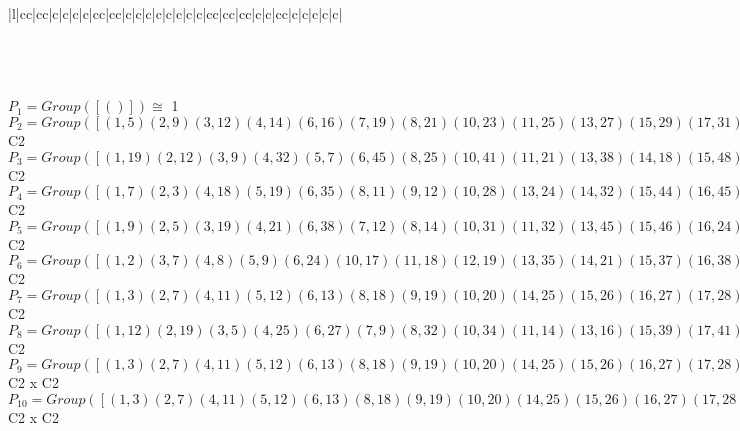 \documentclass[varwidth=\maxdimen,border=10]{standalone}
\begin{document}
\begin{tabular}
\begin{array}{|l|cc|cc|c|c|c|c|cc|cc|c|c|c|c|c|c|c|c|cc|cc|cc|c|c|cc|c|c|c|c|c|}
\end{array}\)\\
\ \\
\ \\
$P_{1} = Group( [ () ] )\cong$ 1\ \\
$P_{2} = Group( [ ( 1, 5)( 2, 9)( 3,12)( 4,14)( 6,16)( 7,19)( 8,21)(10,23)(11,25)(13,27)(15,29)(17,31)(18,32)(20,34)(22,36)(24,38)(26,39)(28,41)(30,42)(33,43)(35,45)(37,46)(40,47)(44,48) ] )\cong$ C2\ \\
$P_{3} = Group( [ ( 1,19)( 2,12)( 3, 9)( 4,32)( 5, 7)( 6,45)( 8,25)(10,41)(11,21)(13,38)(14,18)(15,48)(16,35)(17,34)(20,31)(22,47)(23,28)(24,27)(26,46)(29,44)(30,43)(33,42)(36,40)(37,39) ] )\cong$ C2\ \\
$P_{4} = Group( [ ( 1, 7)( 2, 3)( 4,18)( 5,19)( 6,35)( 8,11)( 9,12)(10,28)(13,24)(14,32)(15,44)(16,45)(17,20)(21,25)(22,40)(23,41)(26,37)(27,38)(29,48)(30,33)(31,34)(36,47)(39,46)(42,43) ] )\cong$ C2\ \\
$P_{5} = Group( [ ( 1, 9)( 2, 5)( 3,19)( 4,21)( 6,38)( 7,12)( 8,14)(10,31)(11,32)(13,45)(15,46)(16,24)(17,23)(18,25)(20,41)(22,42)(26,48)(27,35)(28,34)(29,37)(30,36)(33,47)(39,44)(40,43) ] )\cong$ C2\ \\
$P_{6} = Group( [ ( 1, 2)( 3, 7)( 4, 8)( 5, 9)( 6,24)(10,17)(11,18)(12,19)(13,35)(14,21)(15,37)(16,38)(20,28)(22,30)(23,31)(25,32)(26,44)(27,45)(29,46)(33,40)(34,41)(36,42)(39,48)(43,47) ] )\cong$ C2\ \\
$P_{7} = Group( [ ( 1, 3)( 2, 7)( 4,11)( 5,12)( 6,13)( 8,18)( 9,19)(10,20)(14,25)(15,26)(16,27)(17,28)(21,32)(22,33)(23,34)(24,35)(29,39)(30,40)(31,41)(36,43)(37,44)(38,45)(42,47)(46,48) ] )\cong$ C2\ \\
$P_{8} = Group( [ ( 1,12)( 2,19)( 3, 5)( 4,25)( 6,27)( 7, 9)( 8,32)(10,34)(11,14)(13,16)(15,39)(17,41)(18,21)(20,23)(22,43)(24,45)(26,29)(28,31)(30,47)(33,36)(35,38)(37,48)(40,42)(44,46) ] )\cong$ C2\ \\
$P_{9} = Group( [ ( 1, 3)( 2, 7)( 4,11)( 5,12)( 6,13)( 8,18)( 9,19)(10,20)(14,25)(15,26)(16,27)(17,28)(21,32)(22,33)(23,34)(24,35)(29,39)(30,40)(31,41)(36,43)(37,44)(38,45)(42,47)(46,48), ( 1, 2)( 3, 7)( 4, 8)( 5, 9)( 6,24)(10,17)(11,18)(12,19)(13,35)(14,21)(15,37)(16,38)(20,28)(22,30)(23,31)(25,32)(26,44)(27,45)(29,46)(33,40)(34,41)(36,42)(39,48)(43,47) ] )\cong$ C2 x C2\ \\
$P_{10} = Group( [ ( 1, 3)( 2, 7)( 4,11)( 5,12)( 6,13)( 8,18)( 9,19)(10,20)(14,25)(15,26)(16,27)(17,28)(21,32)(22,33)(23,34)(24,35)(29,39)(30,40)(31,41)(36,43)(37,44)(38,45)(42,47)(46,48), ( 1, 9)( 2, 5)( 3,19)( 4,21)( 6,38)( 7,12)( 8,14)(10,31)(11,32)(13,45)(15,46)(16,24)(17,23)(18,25)(20,41)(22,42)(26,48)(27,35)(28,34)(29,37)(30,36)(33,47)(39,44)(40,43) ] )\cong$ C2 x C2\ \\

\end{tabular}
\end{document}
